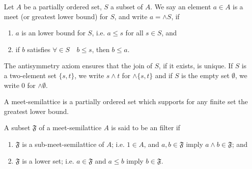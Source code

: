 \documentclass{beamer}
\theoremstyle{plain}
\begin{document}
\begin{frame}
		\begin{definition}\label{upper_defn}
	Let $A$ be a partially ordered set, $S$ a subset of $A$. We say an element $a \in A$
	is a \alert{ meet} (or \alert{ greatest lower bound}) for $S$, and write $a = \wedge S$, if 
	\begin{enumerate}
		\item [(a)] $a$ is an lower bound for $S$, i.e. $a \le s$ for all $s \in S$, and 
		\item [(b)] if $b$ satisfies $\forall \in S\quad  b \le s$, then $b \le a$. 
	\end{enumerate}
	The antisymmetry axiom  ensures that the join of $S$, if it exists, is 
	unique. If $S$ is a two-element set $\{s, t\}$, we write $s \wedge t$ for $\wedge \{s, t\}$ and if $S$	is the empty set $\emptyset$, we write $0$ for  $\wedge \emptyset$.
\end{definition}

\begin{definition}\label{lattice_defn}
	A \alert{meet-semilattice} is a partially ordered set which supports for any finite set the  greatest lower bound.
\end{definition}
\begin{definition}\label{filter_defn}
	A subset $\mathfrak F$ of a meet-semilattice $A$ is said to be an \alert{ filter} if
	\begin{enumerate}
		\item [(a)] $\mathfrak F$ is a sub-meet-semilattice of $A$; i.e. $1\in A$, and $a, b \in \mathfrak F$  imply  	$a \wedge b \in \mathfrak F$; and
		\item [(b)] $\mathfrak F$ is a lower set; i.e. $a \in \mathfrak F$ and $ a\le b$ imply $b \in \mathfrak F$.  
	\end{enumerate}
\end{definition}
\end{frame}
\end{document}
